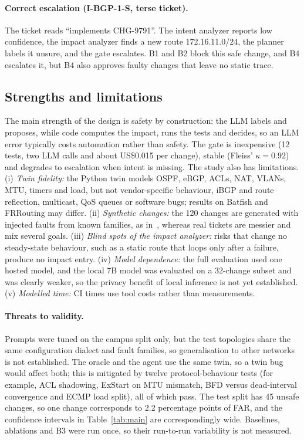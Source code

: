 \documentclass[pdflatex,iicol,sn-mathphys-num]{sn-jnl}%
\theoremstyle{thmstyletwo}%
\begin{document}
\paragraph{Correct escalation (I-BGP-1-S, terse ticket).} The ticket reads ``implements CHG-9791''. The intent analyzer reports low confidence, the impact analyzer finds a new route 172.16.11.0/24, the planner labels it unsure, and the gate escalates. B1 and B2 block this safe change, and B4 escalates it, but B4 also approves faulty changes that leave no static trace.

\subsection{Strengths and limitations}\label{sec:limitations}

The main strength of the design is safety by construction: the LLM labels and proposes, while code computes the impact, runs the tests and decides, so an LLM error typically costs automation rather than safety. The gate is inexpensive (12 tests, two LLM calls and about US\$0.015 per change), stable (Fleiss' $\kappa=0.92$) and degrades to escalation when intent is missing. The study also has limitations. (i) \emph{Twin fidelity:} the Python twin models OSPF, eBGP, ACLs, NAT, VLANs, MTU, timers and load, but not vendor-specific behaviour, iBGP and route reflection, multicast, QoS queues or software bugs; results on Batfish and FRRouting may differ. (ii) \emph{Synthetic changes:} the 120 changes are generated with injected faults from known families, as in~\cite{zhou2026netarena,asadli2026cornetto}, whereas real tickets are messier and mix several goals. (iii) \emph{Blind spots of the impact analyzer:} risks that change no steady-state behaviour, such as a static route that loops only after a failure, produce no impact entry. (iv) \emph{Model dependence:} the full evaluation used one hosted model, and the local 7B model was evaluated on a 32-change subset and was clearly weaker, so the privacy benefit of local inference is not yet established. (v) \emph{Modelled time:} CI times use tool costs rather than measurements.

\paragraph{Threats to validity.} Prompts were tuned on the campus split only, but the test topologies share the same configuration dialect and fault families, so generalisation to other networks is not established. The oracle and the agent use the same twin, so a twin bug would affect both; this is mitigated by twelve protocol-behaviour tests (for example, ACL shadowing, ExStart on MTU mismatch, BFD versus dead-interval convergence and ECMP load split), all of which pass. The test split has 45 unsafe changes, so one change corresponds to 2.2 percentage points of FAR, and the confidence intervals in Table~\ref{tab:main} are correspondingly wide. Baselines, ablations and B3 were run once, so their run-to-run variability is not measured.
\end{document}
